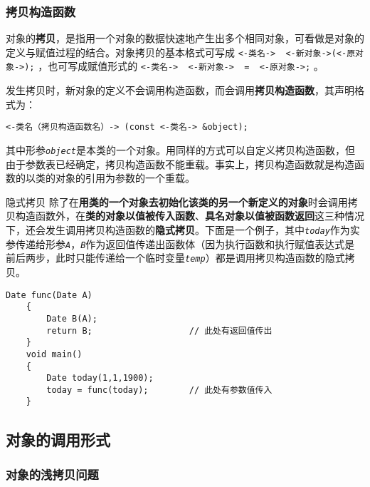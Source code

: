 \documentclass[10pt, a4paper, oneside, fontset=none]{ctexart}
\theoremstyle{plain}
\theoremstyle{definition}
\newcommand{\colors}[1]{\color{#1!75!black}}
\newcommand{\zhu}[2][]{\begin{note}{#1}\xiu #2\end{note}}
\newcommand{\tboba}[1]{\textbf{\kai\color{bali!75!black}#1}}
\newcommand{\tboqi}[1]{\textbf{\xiu\color{qinglv!75!black}#1}}
\begin{document}
\subsubsection{拷贝构造函数}
对象的\tboba{拷贝}，是指用一个对象的数据快速地产生出多个相同对象，可看做是对象的定义与赋值过程的结合。对象拷贝的基本格式可写成 \lstinline[style=intro]{<-类名->  <-新对象->(<-原对象->);} ，也可写成赋值形式的 \lstinline[style=intro]{<-类名->  <-新对象->  =  <-原对象->;} 。

发生拷贝时，新对象的定义不会调用构造函数，而会调用\tboba{拷贝构造函数}，其声明格式为：
\begin{lstlisting}[style=intro, moreemph={object}, emphstyle=\it\ttfamily, ]
	<-类名（拷贝构造函数名）-> (const <-类名-> &object);
\end{lstlisting}
其中形参\texttt{\textit{object}}是本类的一个对象。用同样的方式可以自定义拷贝构造函数，但由于参数表已经确定，拷贝构造函数不能重载。事实上，拷贝构造函数就是构造函数的以类的对象的引用为参数的一个重载。

\zhu[隐式拷贝]{
	除了在\tboqi{用类的一个对象去初始化该类的另一个新定义的对象}时会调用拷贝构造函数外，在\tboqi{类的对象以值被传入函数}、\tboqi{具名对象以值被函数返回}这三种情况下，还会发生调用拷贝构造函数的\tboqi{隐式拷贝}。下面是一个例子，其中\texttt{\textit{today}}作为实参传递给形参\texttt{\textit{A}}，\texttt{\textit{B}}作为返回值传递出函数体（因为执行函数和执行赋值表达式是前后两步，此时只能传递给一个临时变量\texttt{\textit{temp}}）都是调用拷贝构造函数的隐式拷贝。
	\vspace{9\baselineskip}
}
\vspace{-10\baselineskip}
\begin{lstlisting}[style=notec, moreemph={Date}, emphstyle=\colors{qinglv}, moreemph={[2]{A, B, today}}, emphstyle={[2]\it\ttfamily}, ]
	Date func(Date A)
	{
		Date B(A);
		return B;					// 此处有返回值传出
	}
	void main()
	{
		Date today(1,1,1900);
		today = func(today);		// 此处有参数值传入
	}
\end{lstlisting}
\vspace{\baselineskip}

\subsection{对象的调用形式}

\subsubsection{对象的浅拷贝问题}
\end{document}
